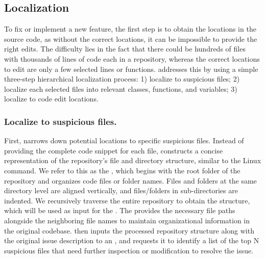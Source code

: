 \subsection{Localization \protect\wearycat} 


To fix or implement a new feature, the first step is to obtain the locations in the source code, as without the correct locations, it can be impossible to provide the right edits. 
The difficulty lies in the fact that there could be hundreds of files
with thousands of lines of code each in a repository, whereas the correct locations to edit are only a few selected lines or functions.
\tech addresses this by using a simple three-step hierarchical localization process: 1) localize to {suspicious} files; 2) localize each selected files into relevant classes{, functions, and variables;} 3) localize to code edit locations.

\subsubsection{Localize to suspicious files.} 
\label{sec:localize_suspicious_files}
First, \tech narrows down potential locations to specific suspicious files. 
Instead of providing the complete code snippet for each file, \tech constructs {a concise representation of} the repository's file and directory structure, similar to the Linux  command. 
We refer to this as the \textbf{\repostructureformat},
which begins with the root folder of the repository and organizes code files or folder names. 
Files and folders at the same directory level are aligned vertically, and files/folders in sub-directories are indented. 
We recursively traverse the entire repository to obtain the structure, which will be used as input for the \llm. 
The \repostructureformat provides the necessary file path{s alongside} the neighboring file names {}{to maintain organizational information in the original codebase}.
\tech then inputs the processed repository structure along with the original issue description to an \llm, and requests it to identify {a} list of the top N suspicious files{ that need {}{further inspection or} modification} to {resolve} the issue. 

